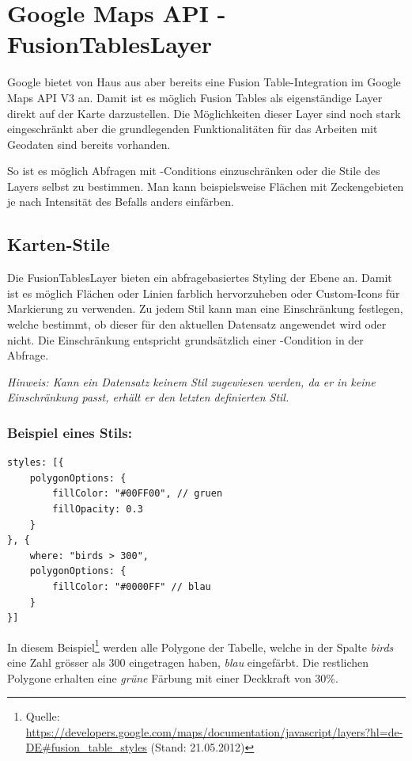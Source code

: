 \section{Google Maps API - FusionTablesLayer}
\label{gmap-api-fusiontableslayer}
Google bietet von Haus aus aber bereits eine Fusion Table-Integration im Google Maps API V3 an. Damit ist es möglich Fusion Tables als eigenständige Layer direkt auf der Karte darzustellen.
Die Möglichkeiten dieser Layer sind noch stark eingeschränkt aber die grundlegenden Funktionalitäten für das Arbeiten mit Geodaten sind bereits vorhanden.

So ist es möglich Abfragen mit -Conditions einzuschränken oder die Stile des Layers selbst zu bestimmen. Man kann beispielsweise Flächen mit Zeckengebieten je nach Intensität des Befalls anders einfärben.

\subsection{Karten-Stile}
\label{fusiontableslayer-styles}
Die FusionTablesLayer bieten ein abfragebasiertes Styling der Ebene an. Damit ist es möglich Flächen oder Linien farblich hervorzuheben oder Custom-Icons für Markierung zu verwenden. Zu jedem Stil kann man eine Einschränkung festlegen, welche bestimmt, ob dieser für den aktuellen Datensatz angewendet wird oder nicht. Die Einschränkung entspricht grundsätzlich einer -Condition in der Abfrage.

\emph{Hinweis: Kann ein Datensatz keinem Stil zugewiesen werden, da er in keine Einschränkung passt, erhält er den letzten definierten Stil.}

\subsubsection{Beispiel eines Stils:}
\lstset{language=JavaScript}
\begin{lstlisting}
styles: [{
	polygonOptions: {
		fillColor: "#00FF00", // gruen
		fillOpacity: 0.3
	}
}, {
	where: "birds > 300",
	polygonOptions: {
		fillColor: "#0000FF" // blau
	}
}]
\end{lstlisting}

In diesem Beispiel\footnote{Quelle: \url{https://developers.google.com/maps/documentation/javascript/layers?hl=de-DE\#fusion_table_styles} (Stand: 21.05.2012)} werden alle Polygone der Tabelle, welche in der Spalte \emph{birds} eine Zahl grösser als 300 eingetragen haben, \emph{blau} eingefärbt. Die restlichen Polygone erhalten eine \emph{grüne} Färbung mit einer Deckkraft von 30\%.

